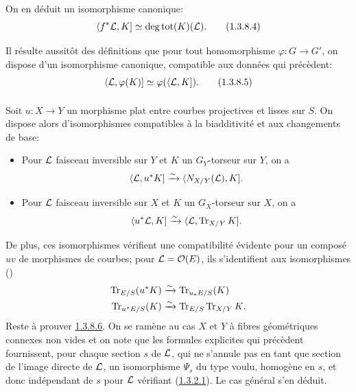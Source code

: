 \documentclass[10pt]{../fichiers-configuration-latex/smfart}
\begin{document}
On en déduit un isomorphisme canonique:
\begin{equation*}
\langle f^{\ast}{\mathcal L},K]\simeq \deg\operatorname{tot}(K)({\mathcal L}){}.\tag{1.3.8.4}
\end{equation*}

Il résulte aussitôt des définitions que pour tout homomorphisme
$\varphi:G\rightarrow G'$, on dispose d'un isomorphisme canonique,
compatible aux données qui précèdent:
\begin{equation*}
\langle {\mathcal L},\varphi(K)]\simeq \varphi(\langle {\mathcal L},K]){}.\tag{1.3.8.5}
\end{equation*}

\setcounter{paragraph}{5}
\paragraph{}
Soit $u:X\rightarrow Y$ un morphisme plat entre courbes projectives et
lisses sur $S$. On dispose alors d'isomorphismes compatibles à la
biadditivité et aux changements de base:
\begin{itemize}
\item[--] Pour ${\mathcal L}$ faisceau inversible sur $Y$ et $K$ un
$G_{Y}$-torseur sur $Y$, on a
$$
\langle {\mathcal L}, u^{\ast}K]\xrightarrow{\sim}\langle N_{X/Y}({\mathcal L}),K]{}.
$$

\item[--] Pour ${\mathcal L}$ faisceau inversible sur $X$ et $K$ un
$G_{X}$-torseur sur $X$, on a
$$
\langle u^{\ast}{\mathcal L},K]\xrightarrow{\sim}
\langle {\mathcal L},\operatorname{Tr}_{X/Y}K]{}.
$$
\end{itemize}
De plus, ces isomorphismes vérifient une compatibilité évidente pour
un composé $uv$ de morphismes de courbes; pour ${\mathcal L}={\mathcal O}(E)$,
ils s'identifient aux isomorphismes ()
\begin{align*}
\operatorname{Tr}_{E/S}(u^{\ast}K) &\xrightarrow{\sim} \operatorname{Tr}_{u_{\ast}E/S}(K)\\
\operatorname{Tr}_{u^{\ast}E/S}(K) &\xrightarrow{\sim} \operatorname{Tr}_{E/S}\operatorname{Tr}_{X/Y}K{}.
\end{align*}
Reste à prouver \hyperref[XVIII.par1.3.8.6]{1.3.8.6}. On se ramène au cas $X$ et $Y$ à fibres
géométriques connexes non vides et on note que les formules explicites
qui précèdent fournissent, pour chaque section $s$ de ${\mathcal L}$,
qui ne s'annule pas en tant que section de l'image directe de
${\mathcal L}$, un isomorphisme $\Psi_{s}$ du type voulu, homogène en
$s$, et donc indépendant de $s$ pour ${\mathcal L}$ vérifiant
(\hyperref[XVIII.par1.3.2.1]{1.3.2.1}). Le cas général s'en déduit.
\end{document}
